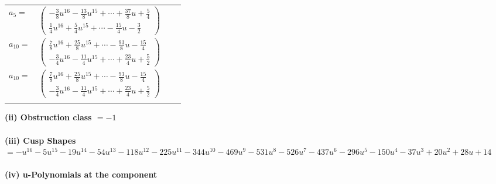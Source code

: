 \documentclass[1p]{elsarticle_modified}
\theoremstyle{definition}
\begin{document}
\begin{tabular}{m{7pt} m{180pt} m{7pt} m{180pt} }
\flushright $a_{5}=$&$\begin{pmatrix}-\frac{3}{8} u^{16}-\frac{13}{8} u^{15}+\cdots+\frac{37}{8} u+\frac{5}{4}\\\frac{1}{4} u^{16}+\frac{5}{4} u^{15}+\cdots-\frac{15}{4} u-\frac{3}{2}\end{pmatrix}$ \\
\flushright $a_{10}=$&$\begin{pmatrix}\frac{7}{8} u^{16}+\frac{25}{8} u^{15}+\cdots-\frac{93}{8} u-\frac{15}{4}\\-\frac{3}{4} u^{16}-\frac{11}{4} u^{15}+\cdots+\frac{23}{4} u+\frac{5}{2}\end{pmatrix}$\\ \flushright $a_{10}=$&$\begin{pmatrix}\frac{7}{8} u^{16}+\frac{25}{8} u^{15}+\cdots-\frac{93}{8} u-\frac{15}{4}\\-\frac{3}{4} u^{16}-\frac{11}{4} u^{15}+\cdots+\frac{23}{4} u+\frac{5}{2}\end{pmatrix}$\\&\end{tabular}
\flushleft \textbf{(ii) Obstruction class $= -1$}\\~\\
\flushleft \textbf{(iii) Cusp Shapes $= - u^{16}-5 u^{15}-19 u^{14}-54 u^{13}-118 u^{12}-225 u^{11}-344 u^{10}-469 u^9-531 u^8-526 u^7-437 u^6-296 u^5-150 u^4-37 u^3+20 u^2+28 u+14$}\\~\\
\newpage\renewcommand{\arraystretch}{1}
\flushleft \textbf{(iv) u-Polynomials at the component}\newline \\
\end{document}
